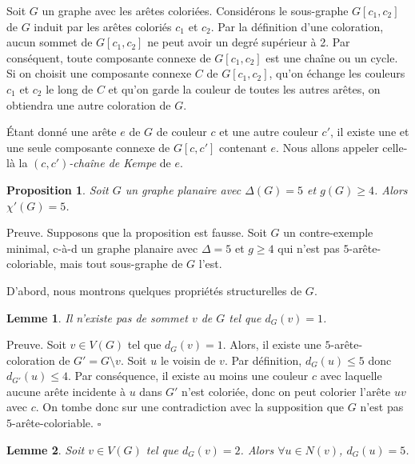 \documentclass[10pt,a4paper]{article}
\newtheorem{proposition}{Proposition}
\newtheorem{lemme}{Lemme}
\newcommand{\ep}{{\hfill $\square$}}
\begin{document}
Soit $G$ un graphe avec les arêtes coloriées. 
Considérons le sous-graphe $G[c_1,c_2]$ de $G$ induit par les arêtes coloriés $c_1$ et $c_2$. Par la définition d'une coloration, aucun sommet de $G[c_1,c_2]$ ne peut avoir un degré supérieur à 2. Par conséquent, toute composante connexe de $G[c_1,c_2]$ est une chaîne ou un cycle. Si on choisit une composante connexe $C$ de $G[c_1,c_2]$, qu'on échange les couleurs $c_1$ et $c_2$ le long de $C$ et qu'on garde la couleur de toutes les autres arêtes, on obtiendra une autre coloration de $G$.

Étant donné une arête $e$ de $G$ de couleur $c$ et une autre couleur $c'$, il existe une et une seule composante connexe de $G[c,c']$ contenant $e$.
Nous allons appeler celle-là la \emph{$(c,c')$-chaîne de Kempe} de $e$.



\begin{proposition}
Soit $G$ un graphe planaire avec $\Delta(G) = 5$ et $g(G) \geq 4$. Alors $\chi'(G)=5$.
\end{proposition}

Preuve. Supposons que la proposition est fausse. Soit $G$ un contre-exemple minimal, c-à-d un graphe planaire avec $\Delta = 5$ et $g \geq 4$ qui n'est pas $5$-arête-coloriable, mais tout sous-graphe de $G$ l'est.

D'abord, nous montrons quelques propriétés structurelles de $G$.

\begin{lemme}
Il n'existe pas de sommet $v$ de $G$ tel que $d_G(v) = 1$.
\label{le:1}
\end{lemme}

Preuve. Soit $v \in V(G)$ tel que $d_G(v) = 1$. Alors, il existe une $5$-arête-coloration de $G'=G \setminus v$. Soit $u$ le voisin de $v$. Par définition, $d_G(u) \leq 5$ donc $d_{G'}(u) \leq 4$. Par conséquence, il existe au moins une couleur $c$ avec laquelle aucune arête incidente à $u$ dans $G'$ n'est coloriée, donc on peut colorier l'arête $uv$ avec $c$. On tombe donc sur une contradiction avec la supposition que $G$ n'est pas $5$-arête-coloriable.
\ep

\begin{lemme}
Soit $v \in V(G)$ tel que $d_G(v) = 2$. Alors $\forall u \in N(v)$, $d_G(u) = 5$.
\label{le:2}
\end{lemme}
\end{document}
